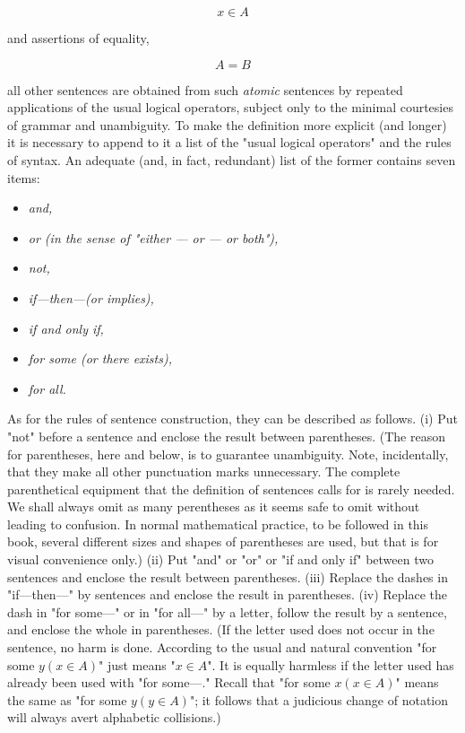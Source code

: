 \begin{equation*}
x \in A
\end{equation*}

and assertions of equality, 

\begin{equation*}
A = B
\end{equation*}

all other sentences are obtained from such \textit{atomic} sentences by repeated applications of the usual logical operators, subject only to the minimal courtesies of grammar and unambiguity. To make the definition more explicit (and longer) it is necessary to append to it a list of the "usual logical operators" and the rules of syntax. An adequate (and, in fact, redundant) list of the former contains seven items:

\begin{itemize}[label={}]
  \itemsep0em
  \item \textit{and,}
  \item \textit{or (in the sense of "either — or — or both"), }
  \item \textit{not,}
  \item \textit{if—then—(or implies),}
  \item \textit{if and only if,}
  \item \textit{for some (or there exists),}
  \item \textit{for all.}
\end{itemize}

As for the rules of sentence construction, they can be described as follows. (i) Put "not" before a sentence and enclose the result between parentheses. (The reason for parentheses, here and below, is to guarantee unambiguity. Note, incidentally, that they make all other punctuation marks unnecessary. The complete parenthetical equipment that the definition of sentences calls for is rarely needed. We shall always omit as many perentheses as it seems safe to omit without leading to confusion. In normal mathematical practice, to be followed in this book, several different sizes and shapes of parentheses are used, but that is for visual convenience only.) (ii) Put "and" or "or" or "if and only if" between two sentences and enclose the result between parentheses. (iii) Replace the dashes in "if—then—" by sentences and enclose the result in parentheses. (iv) Replace the dash in "for some—" or in "for all—" by a letter, follow the result by a sentence, and enclose the whole in parentheses. (If the letter used does not occur in the sentence, no harm is done. According to the usual and natural convention "for some $y (x \in A)$" just means "$ x \in A$". It is equally harmless if the letter used has already been used with "for some—." Recall that "for some $x (x \in A)$" means the same as  "for some $ y (y \in A)$"; it follows that a judicious change of notation will always avert alphabetic collisions.)

